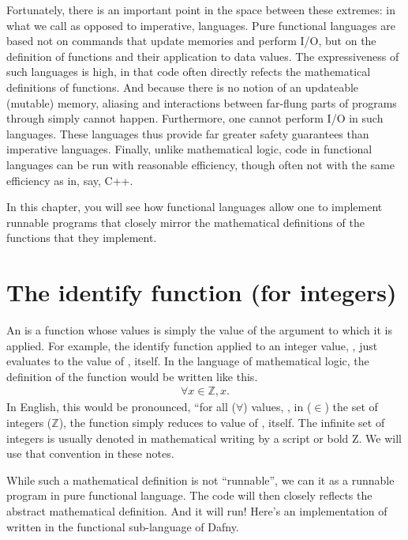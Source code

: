 \documentclass[letterpaper,10pt,english]{sphinxmanual}
\begin{document}
Fortunately, there is an important point in the space between these
extremes: in what we call  as opposed to imperative,
 languages. Pure functional languages are based not on
commands that update memories and perform I/O, but on the definition
of functions and their application to data values. The expressiveness
of such languages is high, in that code often directly refects the
mathematical definitions of functions. And because there is no notion
of an updateable (mutable) memory, aliasing and interactions between
far-flung parts of programs through  simply cannot
happen. Furthermore, one cannot perform I/O in such languages. These
languages thus provide far greater safety guarantees than imperative
languages.  Finally, unlike mathematical logic, code in functional
languages can be run with reasonable efficiency, though often not with
the same efficiency as in, say, C++.

In this chapter, you will see how functional languages allow one to
implement runnable programs that closely mirror the mathematical
definitions of the functions that they implement.


\section{The identify function (for integers)}
\label{\detokenize{04-runnable-math:the-identify-function-for-integers}}
An  is a function whose values is simply the value
of the argument to which it is applied. For example, the identify
function applied to an integer value, , just evaluates to the value
of , itself. In the language of mathematical logic, the definition
of the function would be written like this.
\begin{equation*}
\begin{split}\forall x \in \mathbb{Z}, x.\end{split}
\end{equation*}
In English, this would be pronounced, “for all (\(\forall\))
values, , in (\(\in\)) the set of integers
(\(\mathbb{Z}\)), the function simply reduces to value of ,
itself. The infinite set of integers is usually denoted in
mathematical writing by a script or bold Z. We will use that
convention in these notes.

While such a mathematical definition is not “runnable”, we can
 it as a runnable program in pure functional language. The
code will then closely reflects the abstract mathematical definition.
And it will run!  Here’s an implementation of  written in the
functional sub-language of Dafny.
\end{document}
